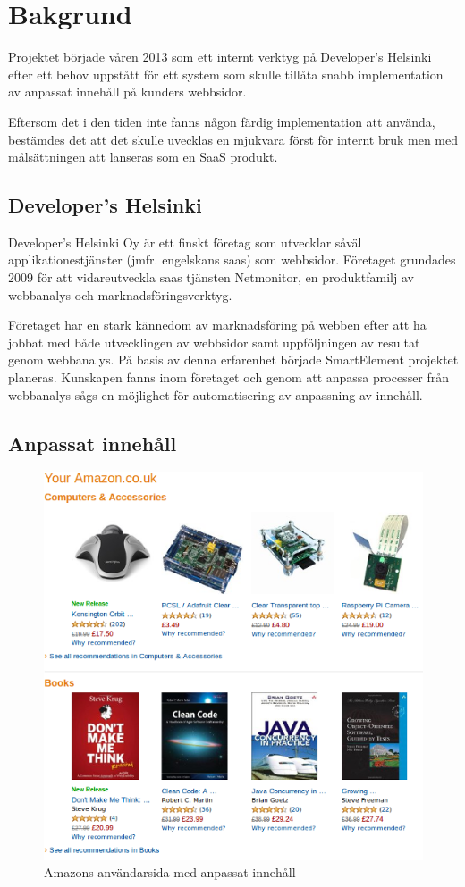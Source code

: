 \section{Bakgrund}

Projektet började våren 2013 som ett internt verktyg på Developer's Helsinki efter ett behov uppstått för ett system som skulle tillåta snabb implementation av anpassat innehåll på kunders webbsidor.

Eftersom det i den tiden inte fanns någon färdig implementation att använda, bestämdes det att det skulle uvecklas en mjukvara först för internt bruk men med målsättningen att lanseras som en SaaS produkt.

\subsection{Developer's Helsinki}

Developer's Helsinki Oy är ett finskt företag som utvecklar såväl applikationestjänster (jmfr. engelskans \gls{saas}) som webbsidor. Företaget grundades 2009 för att vidareutveckla  \gls{saas} tjänsten Netmonitor, en produktfamilj av webbanalys och marknadsföringsverktyg.

Företaget har en stark kännedom av marknadsföring på webben efter att ha jobbat med både utvecklingen av webbsidor samt uppföljningen av resultat genom webbanalys. På basis av denna erfarenhet började SmartElement projektet planeras. Kunskapen fanns inom företaget och genom att anpassa processer från webbanalys sågs en möjlighet för automatisering av anpassning av innehåll.

\subsection{Anpassat innehåll}

\begin{figure}[h!]
\centering
\includegraphics[width=120mm]{assets/images/amazon.png}
\caption{Amazons användarsida med anpassat innehåll}
\label{amazon}
\end{figure}

